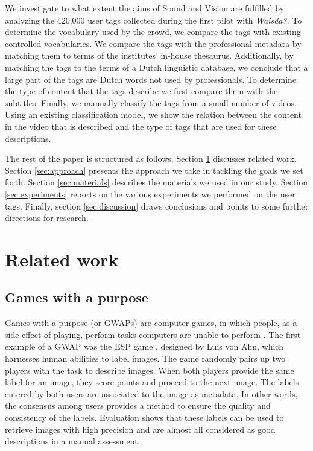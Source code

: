 We investigate to what extent the aims of Sound and Vision are fulfilled by
analyzing the 420,000 user tags collected during the first pilot with
\emph{Waisda?}. To determine the vocabulary used by the crowd, we compare the
tags with existing controlled vocabularies. We compare the tags with the
professional metadata by matching them to terms of the institutes' in-house
thesaurus. Additionally, by matching the tags to the terms of a Dutch
linguistic database, we conclude that a large part of the tags are Dutch words
not used by professionals. To determine the type of content that the tags
describe we first compare them with the subtitles. Finally, we manually
classify the tags from a small number of videos. Using an existing
classification model, we show the relation between the content in the video
that is described and the type of tags that are used for these descriptions.

The rest of the paper is structured as follows. Section \ref{sec:related_work}
discusses related work. Section \ref{sec:approach} presents the approach we
take in tackling the goals we set forth. Section \ref{sec:materials} describes
the materials we used in our study. Section \ref{sec:experiments} reports on
the various experiments we performed on the user tags. Finally, section
\ref{sec:discussion} draws conclusions and points to some further directions
for research.

\newpage

\section{Related work}
\label{sec:related_work}

\subsection{Games with a purpose}

Games with a purpose (or GWAPs) are computer games, in which people, as a side
effect of playing, perform tasks computers are unable to perform \cite{gwap}.
The first example of a GWAP was the ESP game \cite{CHI2004:vonAhn}, designed
by Luis von Ahn, which harnesses human abilities to label images. The game
randomly pairs up two players with the task to describe images. When both
players provide the same label for an image, they score points and proceed to
the next image. The labels entered by both users are associated to the image
as metadata. In other words, the consensus among users provides a method to
ensure the quality and consistency of the labels. Evaluation shows that these
labels can be used to retrieve images with high precision and are almost all
considered as good descriptions in a manual assessment.

